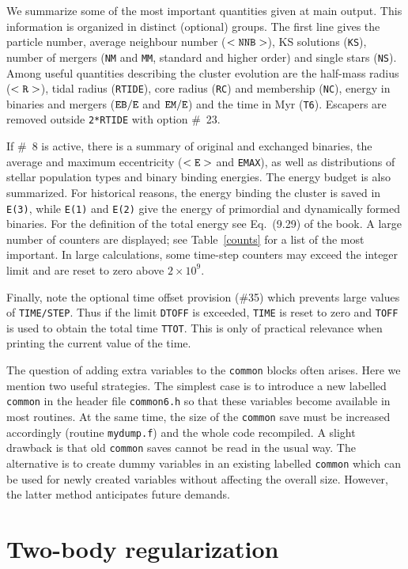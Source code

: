 \documentclass[12pt]{article}
\begin{document}
We summarize some of the most important quantities given at main output.
This information is organized in distinct (optional) groups.
The first line gives the particle number, average neighbour number
($<{\tt NNB}>$), KS solutions ({\tt KS}), number of mergers ({\tt NM} and
{\tt MM}, standard and higher order) and single stars ({\tt NS}).
Among useful quantities describing the cluster evolution are the half-mass
radius ($<{\tt R>}$), tidal radius ({\tt RTIDE}), core radius ({\tt RC}) and
membership ({\tt NC}), energy in binaries and mergers
(${\tt EB/E}$ and ${\tt EM/E}$) and the time in Myr ({\tt T6}).
Escapers are removed outside {\tt 2*RTIDE} with option \#~23.

If \#~8 is active, there is a summary of original and exchanged binaries, the
average and maximum eccentricity ($<{\tt E>}$ and {\tt EMAX}), as well as
distributions of stellar population types and binary binding energies.
The energy budget is also summarized.
For historical reasons, the energy binding the cluster is saved in
{\tt E(3)}, while {\tt E(1)} and {\tt E(2)} give the energy of primordial
and dynamically formed binaries.
For the definition of the total energy see Eq.~(9.29) of the book.
A large number of counters are displayed; see Table~\ref{counts} for a list
of the most important.
In large calculations, some time-step counters may exceed the integer limit
and are reset to zero above $2 \times 10^9$.

Finally, note the optional time offset provision (\#35) which prevents large
values of {\tt TIME/STEP}.
Thus if the limit {\tt DTOFF} is exceeded, {\tt TIME} is reset to zero and
{\tt TOFF} is used to obtain the total time {\tt TTOT}.
This is only of practical relevance when printing the current value of the
time.

The question of adding extra variables to the {\tt common} blocks often
arises.
Here we mention two useful strategies.
The simplest case is to introduce a new labelled {\tt common} in the header
file {\tt common6.h} so that these variables become available in most
routines.
At the same time, the size of the {\tt common} save must be increased
accordingly (\cf routine {\tt mydump.f}) and the whole code recompiled.
A slight drawback is that old {\tt common} saves cannot be read in the
usual way.
The alternative is to create dummy variables in an existing labelled
{\tt common} which can be used for newly created variables without affecting
the overall size.
However, the latter method anticipates future demands.

\section{Two-body regularization}
\end{document}
